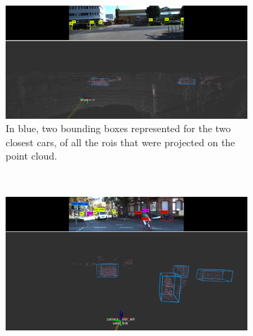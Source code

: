 \begin{figure}[H]
	\centering
	\begin{subfigure}[c]{0.8\textwidth}
		\centering
		\includegraphics[width=\textwidth]{img/image-object-to-point-cloud/bboxes-side-view.png}
		\caption{In blue, two bounding boxes represented for the two closest cars, of all the \acp{roi} that were projected on the point cloud.}
		\label{fig:bboxes-3d-kitti-side}
	\end{subfigure}
	\\ \vspace{4mm}
	\begin{subfigure}[c]{0.8\textwidth}
		\centering	
		\includegraphics[width=\textwidth]{img/image-object-to-point-cloud/bboxes-front-view.png}

\end{subfigure}
\end{figure}
